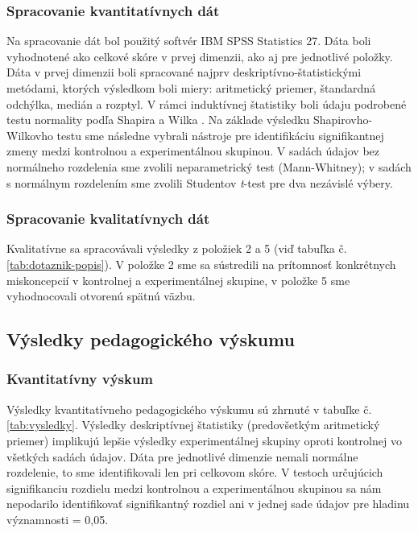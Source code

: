 \subsubsection{Spracovanie kvantitatívnych dát}
Na spracovanie dát bol použitý softvér IBM SPSS Statistics 27. Dáta boli vyhodnotené ako celkové skóre v prvej dimenzii, ako aj pre jednotlivé položky.
Dáta v prvej dimenzii boli spracované najprv deskriptívno-štatistickými metódami, ktorých výsledkom boli miery: aritmetický priemer, štandardná odchýlka, 
medián a rozptyl. V rámci induktívnej štatistiky boli údaju podrobené testu normality podľa Shapira a Wilka \cite{mohdrazaliPowerComparisonsShapirowilk2011, komendaAnalyzaNahodnehoPedagogickem1981, shapiroAnalysisVarianceTest1965}.
Na základe výsledku Shapirovho-Wilkovho testu sme následne vybrali nástroje pre identifikáciu signifikantnej zmeny medzi kontrolnou a experimentálnou skupinou. V sadách údajov bez normálneho rozdelenia sme zvolili 
neparametrický test (Mann-Whitney); v sadách s normálnym rozdelením sme zvolili Studentov \emph{t}-test pre dva nezávislé výbery. 

\subsubsection{Spracovanie kvalitatívnych dát}
Kvalitatívne sa spracovávali výsledky z položiek 2 a 5 (viď tabuľka č. \ref{tab:dotaznik-popis}). V položke 2 sme sa sústredili na prítomnosť konkrétnych miskoncepcií v kontrolnej a experimentálnej skupine, v položke 5 sme 
vyhodnocovali otvorenú spätnú väzbu. 

\subsection{Výsledky pedagogického výskumu}
\subsubsection{Kvantitatívny výskum}
Výsledky kvantitatívneho pedagogického výskumu sú zhrnuté v tabuľke č. \ref{tab:vysledky}. Výsledky deskriptívnej štatistiky (predovšetkým aritmetický priemer) implikujú lepšie výsledky experimentálnej skupiny oproti 
kontrolnej vo všetkých sadách údajov. Dáta pre jednotlivé dimenzie nemali normálne rozdelenie, to sme identifikovali len pri celkovom skóre. V testoch určujúcich signifikanciu rozdielu medzi kontrolnou a experimentálnou
skupinou sa nám nepodarilo identifikovať signifikantný rozdiel ani v jednej sade údajov pre hladinu významnosti \alpha{} = 0,05.

